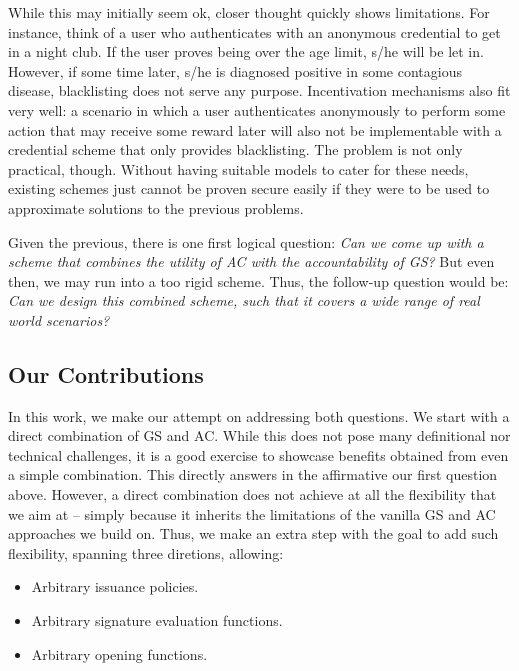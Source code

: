 While this may initially seem ok, closer thought quickly shows limitations. For
instance, think of a user who authenticates with an anonymous credential to get
in a night club. If the user proves being over the age limit, s/he will be let
in. However, if some time later, s/he is diagnosed positive in some contagious
disease, blacklisting does not serve any purpose. Incentivation mechanisms also
fit very well: a scenario in which a user authenticates anonymously to perform
some action that may receive some reward later will also not be implementable
with a credential scheme that only provides blacklisting. The problem is not
only practical, though. Without having suitable models to cater for these needs,
existing schemes just cannot be proven secure easily if they were to be used
to approximate solutions to the previous problems.

Given the previous, there is one first logical question: \emph{Can we come up
  with a scheme that combines the utility of AC with the accountability of
  GS?} But even then, we may run into a too rigid scheme. Thus, the follow-up
question would be: \emph{Can we design this combined scheme, such that it covers
a wide range of real world scenarios?}


\subsection{Our Contributions}
\label{ssec:contributions}

In this work, we make our attempt on addressing both questions. We start with a
direct combination of GS and AC. While this does not pose many definitional nor
technical challenges, it is a good exercise to showcase benefits obtained from
even a simple combination. This directly answers in the affirmative our first
question above. However, a direct combination does not achieve at all the
flexibility that we aim at -- simply because it inherits the limitations of
the vanilla GS and AC approaches we build on. Thus, we make an extra step with
the goal to add such flexibility, spanning three diretions, allowing:

\begin{itemize}
\item Arbitrary issuance policies.
\item Arbitrary signature evaluation functions.
\item Arbitrary opening functions.
\end{itemize}

